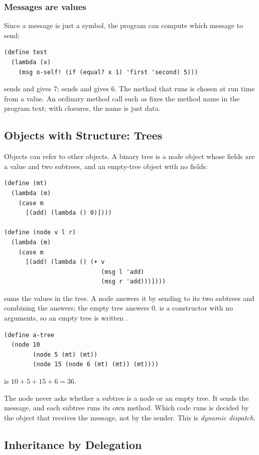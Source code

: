 \subsubsection{Messages are values} Since a message is just a symbol, the program can compute which message to send:
\begin{lstlisting}
(define test
  (lambda (x)
    (msg o-self! (if (equal? x 1) 'first 'second) 5)))
\end{lstlisting}
 sends  and gives 7;  sends  and gives 6. The method that runs is chosen at run time from a value. An ordinary method call such as  fixes the method name in the program text; with closures, the name is just data.

\subsection{Objects with Structure: Trees}

Objects can refer to other objects. A binary tree is a node object whose fields are a value and two subtrees, and an empty-tree object  with no fields:
\begin{lstlisting}
(define (mt)
  (lambda (m)
    (case m
      [(add) (lambda () 0)])))

(define (node v l r)
  (lambda (m)
    (case m
      [(add) (lambda () (+ v
                           (msg l 'add)
                           (msg r 'add)))])))
\end{lstlisting}
 sums the values in the tree. A node answers it by sending  to its two subtrees and combining the answers; the empty tree answers 0.  is a constructor with no arguments, so an empty tree is written .
\begin{lstlisting}
(define a-tree
  (node 10
        (node 5 (mt) (mt))
        (node 15 (node 6 (mt) (mt)) (mt))))
\end{lstlisting}
 is $10 + 5 + 15 + 6 = 36$.

The node never asks whether a subtree is a node or an empty tree. It sends the message, and each subtree runs its own method. Which code runs is decided by the object that receives the message, not by the sender. This is \emph{dynamic dispatch}.

\subsection{Inheritance by Delegation}

